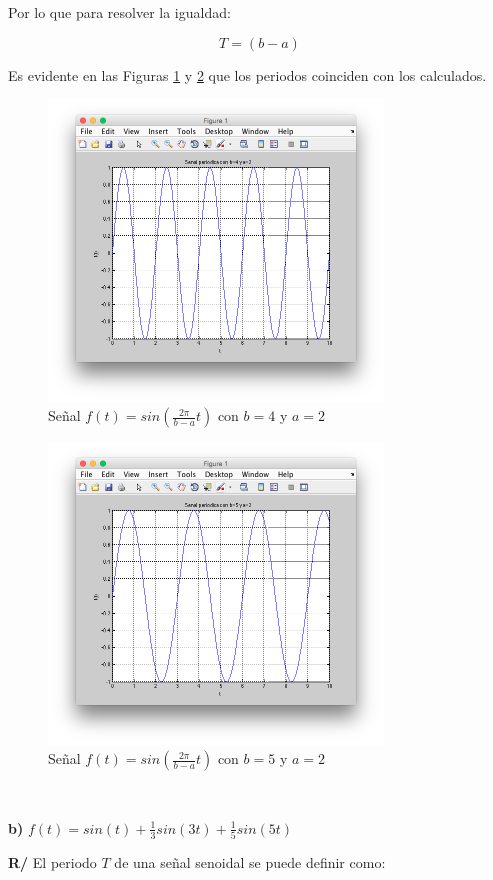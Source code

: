 \documentclass[twocolumn]{article}
\begin{document}
Por lo que para resolver la igualdad:

$$T = (b - a)$$

Es evidente en las Figuras \ref{fig_ba4_2} y \ref{fig_ba5_2} que los periodos coinciden con los calculados.

\begin{figure}[!t]
\centering
\includegraphics[width=3.5in]{imgs/ba4_2.png}
\caption{Señal $f(t) = sin(\frac{2\pi}{b-a}t)$ con $b=4$ y $a=2$}
\label{fig_ba4_2}
\end{figure}

\begin{figure}[!t]
\centering
\includegraphics[width=3.5in]{imgs/ba5_2.png}
\caption{Señal $f(t) = sin(\frac{2\pi}{b-a}t)$ con $b=5$ y $a=2$}
\label{fig_ba5_2}
\end{figure}

$\,$

\textbf{b)} $f(t) = sin(t) + \frac{1}{3}sin(3t) + \frac{1}{5}sin(5t)$

\textbf{R/} El periodo $T$ de una señal senoidal se puede definir como:
\end{document}
